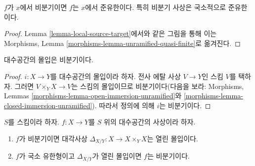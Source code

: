 \begin{lemma}
\label{lemma-unramified-quasi-finite}
$f$가 $x$에서 비분기이면 $f$는 $x$에서 준유한이다.
특히 비분기 사상은 국소적으로 준유한이다.
\end{lemma}

\begin{proof}
Lemma \ref{lemma-local-source-target}에서와 같은 그림을 통해 이는
Morphisms, Lemma \ref{morphisms-lemma-unramified-quasi-finite}로
옮겨진다.
\end{proof}

\begin{lemma}
\label{lemma-immersion-unramified}
대수공간의 몰입은 비분기이다.
\end{lemma}

\begin{proof}
$i : X \to Y$를 대수공간의 몰입이라 하자. 전사 에탈 사상 $V \to Y$인
스킴 $V$를 택하자. 그러면 $V \times_Y X \to V$는 스킴의 몰입이므로
비분기이다(다음을 보라:
Morphisms, Lemmas \ref{morphisms-lemma-open-immersion-unramified}와
\ref{morphisms-lemma-closed-immersion-unramified}).
따라서 정의에 의해 $i$는 비분기이다.
\end{proof}






\begin{lemma}
\label{lemma-diagonal-unramified-morphism}
$S$를 스킴이라 하자.
$f : X \to Y$를 $S$ 위의 대수공간의 사상이라 하자.
\begin{enumerate}
\item $f$가 비분기이면 대각사상
$\Delta_{X/Y} : X \to X \times_Y X$는 열린 몰입이다.
\item $f$가 국소 유한형이고
$\Delta_{X/Y}$가 열린 몰입이면 $f$는 비분기이다.
\end{enumerate}
\end{lemma}

